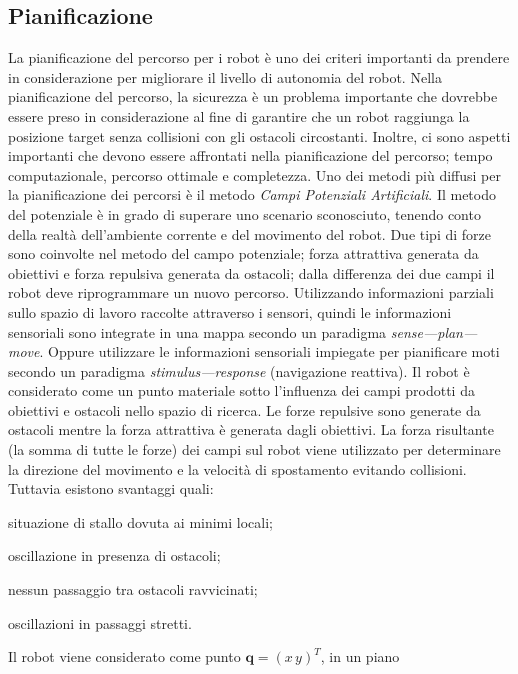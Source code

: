 \subsection{Pianificazione}
\label{ssec:ArtPotField}
La pianificazione del percorso per i robot è uno dei criteri importanti da
prendere in considerazione per migliorare il livello di autonomia del robot.
Nella pianificazione del percorso, la sicurezza è un problema importante che
dovrebbe essere preso in considerazione al fine di garantire che un robot
raggiunga la posizione target senza collisioni con gli ostacoli circostanti.
Inoltre, ci sono aspetti importanti che devono essere affrontati nella
pianificazione del percorso; tempo computazionale, percorso ottimale e
completezza.
Uno dei metodi più diffusi per la pianificazione dei percorsi è il metodo
\emph{Campi Potenziali Artificiali}.
Il metodo del potenziale è in grado di superare uno scenario sconosciuto,
tenendo conto della realtà dell'ambiente corrente e del movimento del robot.
Due tipi di forze sono coinvolte nel metodo del campo potenziale;
forza attrattiva generata da obiettivi e forza repulsiva generata da ostacoli;
dalla differenza dei due campi il robot deve riprogrammare un nuovo
percorso\cite{apotetianfield}.
Utilizzando informazioni parziali sullo spazio di lavoro raccolte attraverso i
sensori, quindi le informazioni sensoriali sono integrate in una mappa secondo
un paradigma \emph{sense---plan---move}.
Oppure utilizzare le informazioni sensoriali impiegate per pianificare moti
secondo un paradigma \emph{stimulus---response} (navigazione reattiva).
Il robot è considerato come un punto materiale sotto l'influenza dei campi
prodotti da obiettivi e ostacoli nello spazio di ricerca. Le forze repulsive
sono generate da ostacoli mentre la forza attrattiva è generata dagli obiettivi.
La forza risultante (la somma di tutte le forze) dei campi sul robot viene
utilizzato per determinare la direzione del movimento e la velocità di
spostamento evitando collisioni\cite{5498220}.
Tuttavia esistono svantaggi quali:
\begin{enumerate*}[label={\alph*)},font={\bfseries}]
\item situazione di stallo dovuta ai minimi locali;
\item oscillazione in presenza di ostacoli;
\item nessun passaggio tra ostacoli ravvicinati;
\item oscillazioni in passaggi stretti\cite{131810}.
\end{enumerate*}
Il robot viene considerato come punto $\mathbf{q} = (x \, y)^T$, in un piano
